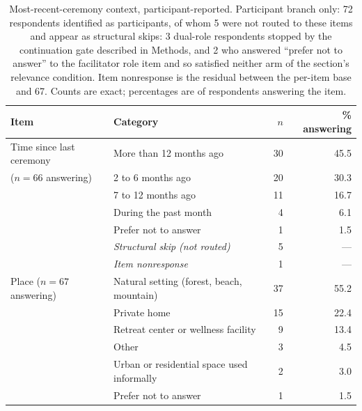 \documentclass[12pt]{article}
\begin{document}
\clearpage
\begin{table}[htbp]
\centering
\caption{Most-recent-ceremony context, participant-reported. Participant branch only: 72 respondents
identified as participants, of whom 5 were not routed to these items and appear as structural skips: 3
dual-role respondents stopped by the continuation gate described in Methods, and 2 who answered ``prefer not
to answer'' to the facilitator role item and so satisfied neither arm of the section's relevance condition.
Item nonresponse is the residual between the per-item base and 67. Counts are exact; percentages are of
respondents answering the item.}
\label{tab:context}
\begin{tabular}{p{4.2cm}p{5.8cm}rr}
\toprule
Item & Category & $n$ & \% answering \\
\midrule
Time since last ceremony & More than 12 months ago & 30 & 45.5 \\
($n=66$ answering)                & 2 to 6 months ago & 20 & 30.3 \\
                                  & 7 to 12 months ago & 11 & 16.7 \\
                                  & During the past month & 4 & 6.1 \\
                                  & Prefer not to answer & 1 & 1.5 \\
                                  & \emph{Structural skip (not routed)} & 5 & --- \\
                                  & \emph{Item nonresponse} & 1 & --- \\
\addlinespace
Place ($n=67$ answering)   & Natural setting (forest, beach, mountain) & 37 & 55.2 \\
                 & Private home & 15 & 22.4 \\
                 & Retreat center or wellness facility & 9 & 13.4 \\
                 & Other & 3 & 4.5 \\
                 & Urban or residential space used informally & 2 & 3.0 \\
                 & Prefer not to answer & 1 & 1.5 \\

\end{tabular}
\end{table}
\end{document}
